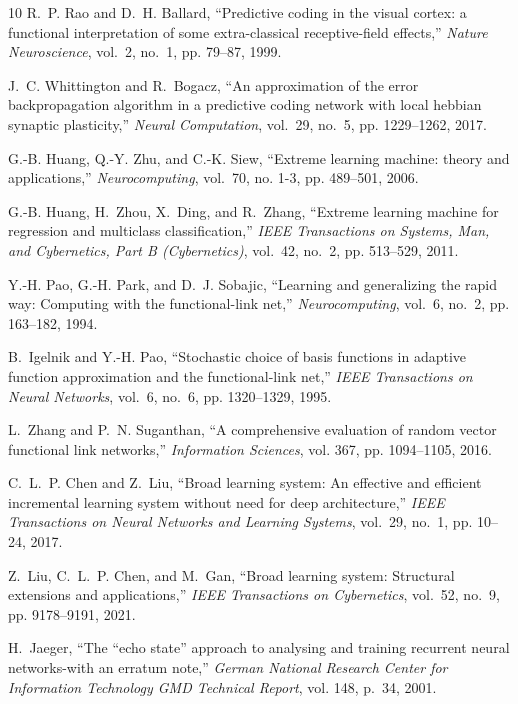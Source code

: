 \documentclass[journal]{IEEEtran}
\begin{document}
\begin{thebibliography}{10}
R.~P. Rao and D.~H. Ballard, ``Predictive coding in the visual cortex: a functional interpretation of some extra-classical receptive-field effects,'' \emph{Nature Neuroscience}, vol.~2, no.~1, pp. 79--87, 1999.

J.~C. Whittington and R.~Bogacz, ``An approximation of the error backpropagation algorithm in a predictive coding network with local hebbian synaptic plasticity,'' \emph{Neural Computation}, vol.~29, no.~5, pp. 1229--1262, 2017.

G.-B. Huang, Q.-Y. Zhu, and C.-K. Siew, ``Extreme learning machine: theory and applications,'' \emph{Neurocomputing}, vol.~70, no. 1-3, pp. 489--501, 2006.

G.-B. Huang, H.~Zhou, X.~Ding, and R.~Zhang, ``Extreme learning machine for regression and multiclass classification,'' \emph{IEEE Transactions on Systems, Man, and Cybernetics, Part B (Cybernetics)}, vol.~42, no.~2, pp. 513--529, 2011.

Y.-H. Pao, G.-H. Park, and D.~J. Sobajic, ``Learning and generalizing the rapid way: Computing with the functional-link net,'' \emph{Neurocomputing}, vol.~6, no.~2, pp. 163--182, 1994.

B.~Igelnik and Y.-H. Pao, ``Stochastic choice of basis functions in adaptive function approximation and the functional-link net,'' \emph{IEEE Transactions on Neural Networks}, vol.~6, no.~6, pp. 1320--1329, 1995.

L.~Zhang and P.~N. Suganthan, ``A comprehensive evaluation of random vector functional link networks,'' \emph{Information Sciences}, vol. 367, pp. 1094--1105, 2016.

C.~L.~P. Chen and Z.~Liu, ``Broad learning system: An effective and efficient incremental learning system without need for deep architecture,'' \emph{IEEE Transactions on Neural Networks and Learning Systems}, vol.~29, no.~1, pp. 10--24, 2017.

Z.~Liu, C.~L.~P. Chen, and M.~Gan, ``Broad learning system: Structural extensions and applications,'' \emph{IEEE Transactions on Cybernetics}, vol.~52, no.~9, pp. 9178--9191, 2021.

H.~Jaeger, ``The “echo state” approach to analysing and training recurrent neural networks-with an erratum note,'' \emph{German National Research Center for Information Technology GMD Technical Report}, vol. 148, p.~34, 2001.


\end{thebibliography}
\end{document}
